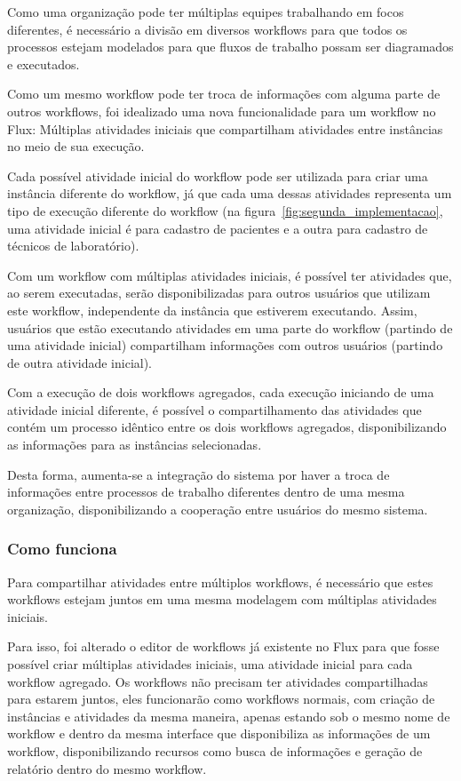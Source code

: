 Como uma organização pode ter múltiplas equipes trabalhando em focos diferentes, é necessário a divisão em diversos workflows para que todos os processos estejam modelados para que fluxos de trabalho possam ser diagramados e executados.

Como um mesmo workflow pode ter troca de informações com alguma parte de outros workflows, foi idealizado uma nova funcionalidade para um workflow no Flux: Múltiplas atividades iniciais que compartilham atividades entre instâncias no meio de sua execução.

Cada possível atividade inicial do workflow pode ser utilizada para criar uma instância diferente do workflow, já que cada uma dessas atividades representa um tipo de execução diferente do workflow (na figura~\ref{fig:segunda_implementacao}, uma atividade inicial é para cadastro de pacientes e a outra para cadastro de técnicos de laboratório).

Com um workflow com múltiplas atividades iniciais, é possível ter atividades que, ao serem executadas, serão disponibilizadas para outros usuários que utilizam este workflow, independente da instância que estiverem executando. Assim, usuários que estão executando atividades em uma parte do workflow (partindo de uma atividade inicial) compartilham informações com outros usuários (partindo de outra atividade inicial).

Com a execução de dois workflows agregados, cada execução iniciando de uma atividade inicial diferente, é possível o compartilhamento das atividades que contém um processo idêntico entre os dois workflows agregados, disponibilizando as informações para as instâncias selecionadas.

Desta forma, aumenta-se a integração do sistema por haver a troca de informações entre processos de trabalho diferentes dentro de uma mesma organização, disponibilizando a cooperação entre usuários do mesmo sistema.

\subsubsection{Como funciona}

Para compartilhar atividades entre múltiplos workflows, é necessário que estes workflows estejam juntos em uma mesma modelagem com múltiplas atividades iniciais.

Para isso, foi alterado o editor de workflows já existente no Flux para que fosse possível criar múltiplas atividades iniciais, uma atividade inicial para cada workflow agregado.
Os workflows não precisam ter atividades compartilhadas para estarem juntos, eles funcionarão como workflows normais, com criação de instâncias e atividades da mesma maneira, apenas estando sob o mesmo nome de workflow e dentro da mesma interface que disponibiliza as informações de um workflow, disponibilizando recursos como busca de informações e geração de relatório dentro do mesmo workflow.

